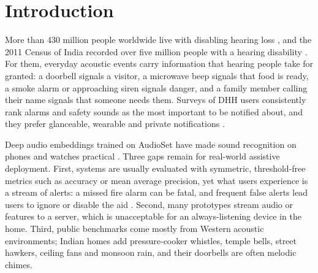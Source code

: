 \documentclass{svproc}
\begin{document}
\section{Introduction}
More than 430 million people worldwide live with disabling hearing loss \cite{who2021}, and the 2011 Census of India recorded over five million people with a hearing disability \cite{census2011}. For them, everyday acoustic events carry information that hearing people take for granted: a doorbell signals a visitor, a microwave beep signals that food is ready, a smoke alarm or approaching siren signals danger, and a family member calling their name signals that someone needs them. Surveys of DHH users consistently rank alarms and safety sounds as the most important to be notified about, and they prefer glanceable, wearable and private notifications \cite{bragg2016,findlater2019}.

Deep audio embeddings trained on AudioSet \cite{gemmeke2017} have made sound recognition on phones and watches practical \cite{jain2020homesound,jain2020soundwatch,jain2022protosound,laput2018}. Three gaps remain for real-world assistive deployment. First, systems are usually evaluated with symmetric, threshold-free metrics such as accuracy or mean average precision, yet what users experience is a stream of alerts: a missed fire alarm can be fatal, and frequent false alerts lead users to ignore or disable the aid \cite{jain2020homesound}. Second, many prototypes stream audio or features to a server, which is unacceptable for an always-listening device in the home. Third, public benchmarks come mostly from Western acoustic environments; Indian homes add pressure-cooker whistles, temple bells, street hawkers, ceiling fans and monsoon rain, and their doorbells are often melodic chimes.
\end{document}
